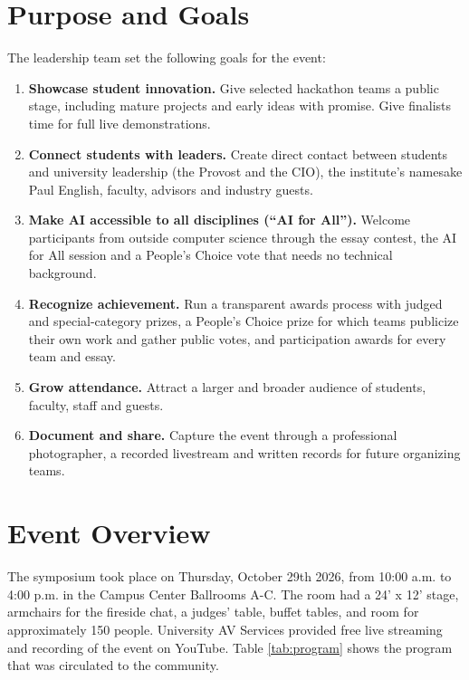 \documentclass[sigconf,nonacm]{acmart}
\begin{document}
\section{Purpose and Goals}
The leadership team set the following goals for the event:
\begin{enumerate}
  \item \textbf{Showcase student innovation.} Give selected hackathon teams a public stage, including mature projects and early ideas with promise. Give finalists time for full live demonstrations.
  \item \textbf{Connect students with leaders.} Create direct contact between students and university leadership (the Provost and the CIO), the institute's namesake Paul English, faculty, advisors and industry guests.
  \item \textbf{Make AI accessible to all disciplines (``AI for All'').} Welcome participants from outside computer science through the essay contest, the AI for All session and a People's Choice vote that needs no technical background.
  \item \textbf{Recognize achievement.} Run a transparent awards process with judged and special-category prizes, a People's Choice prize for which teams publicize their own work and gather public votes, and participation awards for every team and essay.
  \item \textbf{Grow attendance.} Attract a larger and broader audience of students, faculty, staff and guests.
  \item \textbf{Document and share.} Capture the event through a professional photographer, a recorded livestream and written records for future organizing teams.
\end{enumerate}


\section{Event Overview}
The symposium took place on Thursday, October 29th 2026, from 10:00 a.m. to 4:00 p.m. in the Campus Center Ballrooms A-C. The room had a 24' x 12' stage, armchairs for the fireside chat, a judges' table, buffet tables, and room for approximately 150 people. University AV Services provided free live streaming and recording of the event on YouTube. Table \ref{tab:program} shows the program that was circulated to the community.
\end{document}
